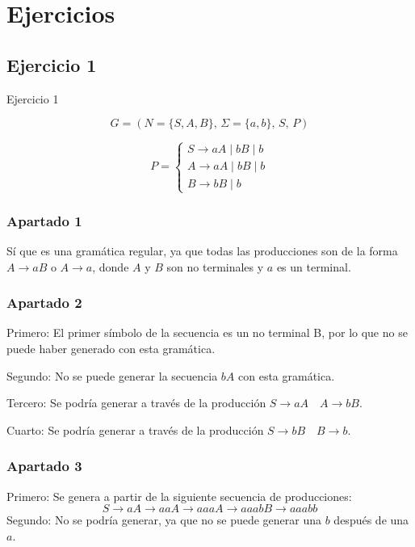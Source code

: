 \section{Ejercicios}

\subsection{Ejercicio 1}
\begin{exercisebox}{Ejercicio 1}

    \[
    G = (N = \{S, A, B\}, \, \Sigma = \{a, b\}, \, S, \, P)
    \]
    
    \[
    P = 
    \begin{cases}
    S \to aA \mid bB \mid b \\
    A \to aA \mid bB \mid b \\
    B \to bB \mid b
    \end{cases}
    \]

\end{exercisebox}

\subsubsection*{Apartado 1}

Sí que es una gramática regular, ya que todas las producciones son de la forma
$A \to aB$ o $A \to a$, donde $A$ y $B$ son no terminales y $a$ es un terminal.

\subsubsection*{Apartado 2}
Primero:
El primer símbolo de la secuencia es un no terminal B, por lo que no se puede
haber generado con esta gramática.

Segundo:
No se puede generar la secuencia $bA$ con esta gramática.

Tercero:
Se podría generar a través de la producción $S \to aA \quad A \to bB$.

Cuarto:
Se podría generar a través de la producción $S \to bB \quad B \to b$.

\subsubsection*{Apartado 3}

Primero:
Se genera a partir de la siguiente secuencia de producciones:
$$S \to aA \to aaA \to aaaA \to aaabB \to aaabb$$
Segundo:
No se podría generar, ya que no se puede generar una $b$ después de una $a$.

